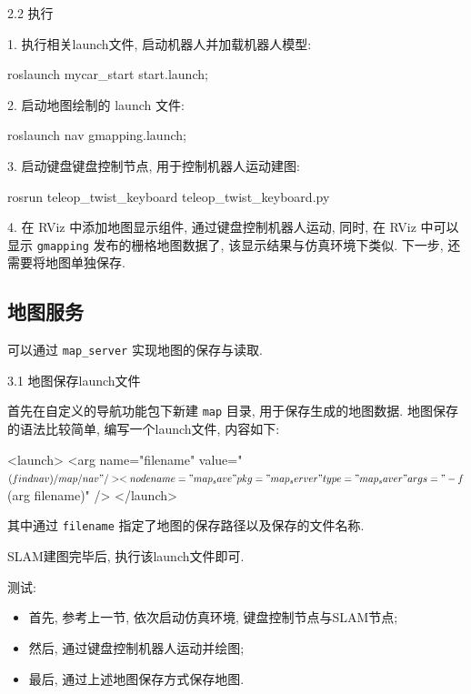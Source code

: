 \documentclass[openany, fontset=windowsold]{ctexbook}
\theoremstyle{kaiti}
\theoremstyle{normal}
\begin{document}
2.2 执行

1. 执行相关launch文件, 启动机器人并加载机器人模型: 

\begin{bash}
  roslaunch mycar_start start.launch; 
\end{bash}

2. 启动地图绘制的 launch 文件: 

\begin{bash}
  roslaunch nav gmapping.launch; 
\end{bash}

3. 启动键盘键盘控制节点, 用于控制机器人运动建图: 

\begin{bash}
  rosrun teleop_twist_keyboard teleop_twist_keyboard.py
\end{bash}

4. 在 RViz 中添加地图显示组件, 通过键盘控制机器人运动, 同时, 在 RViz 中可以显示 \verb|gmapping| 发布的栅格地图数据了, 该显示结果与仿真环境下类似. 下一步, 还需要将地图单独保存.

\subsection{地图服务}

可以通过 \verb|map_server| 实现地图的保存与读取.

3.1 地图保存launch文件

首先在自定义的导航功能包下新建 \verb|map| 目录, 用于保存生成的地图数据. 地图保存的语法比较简单, 编写一个launch文件, 内容如下:

\begin{xml}
  <launch>
      <arg name="filename" value="$(find nav)/map/nav" />
      <node name="map_save" pkg="map_server" type="map_saver" args="-f $(arg filename)" />
  </launch>
\end{xml}

其中通过 \verb|filename| 指定了地图的保存路径以及保存的文件名称.

SLAM建图完毕后, 执行该launch文件即可.

测试:

\begin{itemize}
  \item 首先, 参考上一节, 依次启动仿真环境, 键盘控制节点与SLAM节点; 
  \item 然后, 通过键盘控制机器人运动并绘图; 
  \item 最后, 通过上述地图保存方式保存地图.
\end{itemize}
\end{document}
